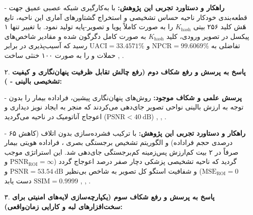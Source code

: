 {-} \textbf{راهکار و دستاورد تجربی این پژوهش:} با به‌کارگیری شبکه عصبی عمیق  جهت قطعه‌بندی خودکار ناحیه حساس تشخیصی  و استخراج گشتاورهای آماری این ناحیه، تابع هَش  کلید ۲۵۶ بیتی $K_{\mathrm{hash}}$ را به صورت کاملاً پویا و تصویر{-}پایه تولید نمود. با تغییر تنها ۱ پیکسل در تصویر ورودی، کلید $K_{\mathrm{hash}}$ به صورت کامل دگرگون شده و مقادیر شاخص‌های تفاضلی به $\mathrm{NPCR} = 99.6069\%$ و $\mathrm{UACI} = 33.4571\%$ رسید که آسیب‌پذیری در برابر حملات  و  را به صورت ۱۰۰ خنثی ساخت , .\par



۲. \textbf{پاسخ به پرسش و رفع شکاف دوم (رفع چالش تقابل ظرفیت پنهان‌نگاری و کیفیت تشخیصی بالینی {-} ):}\par

{-} \textbf{پرسش علمی و شکاف موجود:} روش‌های پنهان‌نگاری پیشین، فراداده بیمار را بدون توجه به ارزش بالینی نواحی تصویر جای‌دهی می‌کردند که منجر به ایجاد نویز دیداری و اعوجاج آناتومیک در ناحیه  می‌گردید ($\mathrm{PSNR} < 40\mathrm{\ dB}$) , , .\par

{-} \textbf{راهکار و دستاورد تجربی این پژوهش:} با ترکیب فشرده‌سازی بدون اتلاف  (کاهش ۶۵ درصدی حجم فراداده) و الگوریتم تشخیص برجستگی بصری ، فراداده هویتی بیمار صرفاً در ۲ بیت کم‌ارزش  پس‌زمینه کم‌برجستگی  جای‌دهی شد. این استراتژی موجب گردید که ناحیه تشخیصی پزشکی دچار صفر درصد اعوجاج گردد ($\mathrm{PSNR}_{\mathrm{ROI}} = \infty$ و $\mathrm{MSE}_{\mathrm{ROI}} = 0$) و شفافیت استگو کل تصویر به شاخص بی‌نظیر $\mathrm{PSNR} = 53.54\mathrm{\ dB}$ و $\mathrm{SSIM} = 0.9999$ دست یابد , , .\par



۳. \textbf{پاسخ به پرسش و رفع شکاف سوم (یکپارچه‌سازی لایه‌های امنیتی برای سخت‌افزارهای لبه  و کارایی زمان‌واقعی):}\par

